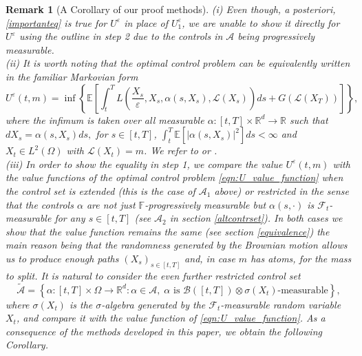 \documentclass[reqno,11pt]{amsart}
\newtheorem{remark}[theorem]{Remark}
\numberwithin{equation}{section}
\newcommand{\R}{\mathbb{R}} %
\newcommand{\e}{\varepsilon}
\begin{document}
    \begin{remark}[A Corollary of our proof methods]
        (i) Even though, a posteriori, \eqref{importanteq} is true for $U^\e$ in place of $U^\e_1$, we are unable to show it directly for $U^\e$ using the outline in step 2 due to the controls in $\mathcal{A}$ being progressively measurable.\\[0.5ex]
        (ii) It is worth noting that the optimal control problem can be equivalently written in the familiar Markovian form
        $$U^\e(t,m)=\inf\left\{\mathbb{E}\left[\int_t^TL\left(\frac{X_s}{\e},X_s,\alpha(s,X_s),\mathcal{L}(X_s)\right)ds+G(\mathcal{L}(X_T))       \right]\right\},$$
        where the infimum is taken over all measurable $\alpha\colon [t,T]\times\R^d\to \R$  such that $dX_s=\alpha(s,X_s)ds,$ for $s\in[t,T]$, $\int_t^T\mathbb{E}[|\alpha(s,X_s)|^2]ds<\infty$ and $X_t\in L^2(\Omega)$ with $\mathcal{L}(X_t)=m$. We refer to \cite[Theorem 8.1]{lacker2022superposition} or \cite[Lemma 6.2]{CecchinDaudinJacksonMartini2025}.\\[0.5ex]
        (iii) In order to show the equality in step 1, we compare the value $U^\e(t,m)$ with the value functions of the optimal control problem \eqref{eqn:U_value_function} when the control set is extended (this is the case of $\mathcal{A}_1$ above) or restricted in the sense that the controls $\alpha$ are not just $\mathbb{F}$-progressively measurable but $\alpha(s,\cdot)$ is $\mathcal{F}_t$-measurable for any $s\in [t,T]$ (see $\mathcal{A}_2$ in section \ref{altcontrset}). In both cases we show that the value function remains the same (see section \ref{equivalence}) the main reason being that the randomness generated by the Brownian motion allows us to produce enough paths $(X_s)_{s\in [t,T]}$ and, in case $m$ has atoms, for the mass to split. It is natural to consider the even further restricted control set
        $$\widetilde{\mathcal{A}}=\left\{\alpha\colon [t,T]\times\Omega\to \R^d: \alpha\in \mathcal{A},\; \alpha\text{ is }\mathcal{B}([t,T])\otimes\sigma(X_t)\text{-measurable}\right\},$$
        where $\sigma(X_t)$ is the $\sigma$-algebra generated by the $\mathcal{F}_t$-measurable random variable $X_t$, and compare it with the value function of \eqref{eqn:U_value_function}. As a consequence of the methods developed in this paper, we obtain the following Corollary.
\end{remark}
\end{document}
